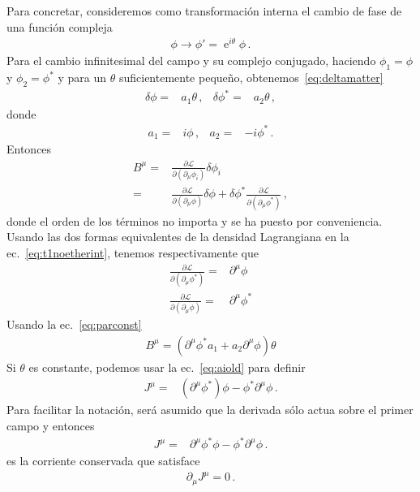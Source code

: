 Para concretar, consideremos como transformación interna el cambio de fase de una función compleja
\begin{align}
  \phi\to \phi'=\operatorname{e}^{i\theta}\phi\,.
\end{align}
Para el cambio infinitesimal del campo y su complejo conjugado,  haciendo $\phi_1=\phi$ y $\phi_2=\phi^{*}$ y
para un $\theta$ suficientemente pequeño, obtenemos~\eqref{eq:deltamatter}
\begin{align}
  \label{eq:parconst}
  \delta\phi=&a_1 \theta\,, &  \delta\phi^{*}=&  a_2 \theta\,, 
\end{align}
donde
\begin{align}
  \label{eq:aiold}
  a_1=& i\phi \,, & a_2=&-i\phi^{*}\,.
\end{align}
Entonces
\begin{align}
  B^{\mu}=& \frac{\partial\mathcal{L}}{\partial(\partial_{\mu}\phi_i)}\delta\phi_{i}\\
  =& \frac{\partial\mathcal{L}}{\partial(\partial_{\mu}\phi)}\delta\phi
  +  \delta\phi^*\frac{\partial\mathcal{L}}{\partial(\partial_{\mu}\phi^*)}\,,
\end{align}
donde el orden de los términos no importa y se ha puesto por conveniencia. Usando las dos formas equivalentes de la densidad Lagrangiana en la ec.~\eqref{eq:t1noetherint}, tenemos respectivamente que
\begin{align*}
  \frac{\partial\mathcal{L}}{\partial(\partial_{\mu}\phi^*)} =& \partial^\mu \phi\\
  \frac{\partial\mathcal{L}}{\partial(\partial_{\mu}\phi)}  =& \partial^\mu \phi^*
\end{align*}
Usando la ec.~\eqref{eq:parconst}
\begin{align}
  B^\mu = \left(\partial^\mu \phi^* a_1 + a_2 \partial^\mu\phi \right)\theta 
\end{align}
Si $\theta$ es constante, podemos usar la ec.~\eqref{eq:aiold}  para  definir
\begin{align}
  J^\mu =& \left(\partial^\mu \phi^*\right) \phi - \phi^* \partial^\mu\phi\,.
\end{align}
Para facilitar la notación, será asumido que la derivada sólo actua sobre el primer campo y entonces
\begin{align}
  J^\mu =& \partial^\mu \phi^* \phi - \phi^* \partial^\mu\phi\,.
\end{align}
es la corriente conservada que satisface
\begin{align}
  \partial_\mu J^\mu =0\,.
\end{align}



